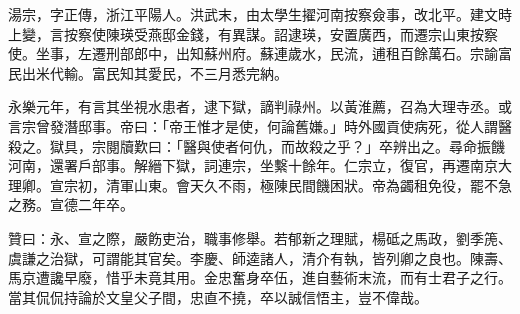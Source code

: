 \begin{pinyinscope}
湯宗，字正傳，浙江平陽人。洪武末，由太學生擢河南按察僉事，改北平。建文時上變，言按察使陳瑛受燕邸金錢，有異謀。詔逮瑛，安置廣西，而遷宗山東按察使。坐事，左遷刑部郎中，出知蘇州府。蘇連歲水，民流，逋租百餘萬石。宗諭富民出米代輸。富民知其愛民，不三月悉完納。

永樂元年，有言其坐視水患者，逮下獄，謫判祿州。以黃淮薦，召為大理寺丞。或言宗曾發潛邸事。帝曰：「帝王惟才是使，何論舊嫌。」時外國貢使病死，從人謂醫殺之。獄具，宗閱牘歎曰：「醫與使者何仇，而故殺之乎？」卒辨出之。尋命振饑河南，還署戶部事。解縉下獄，詞連宗，坐繫十餘年。仁宗立，復官，再遷南京大理卿。宣宗初，清軍山東。會天久不雨，極陳民間饑困狀。帝為蠲租免役，罷不急之務。宣德二年卒。

贊曰：永、宣之際，嚴飭吏治，職事修舉。若郁新之理賦，楊砥之馬政，劉季箎、虞謙之治獄，可謂能其官矣。李慶、師逵諸人，清介有執，皆列卿之良也。陳壽、馬京遭讒早廢，惜乎未竟其用。金忠奮身卒伍，進自藝術末流，而有士君子之行。當其侃侃持論於文皇父子間，忠直不撓，卒以誠信悟主，豈不偉哉。


\end{pinyinscope}